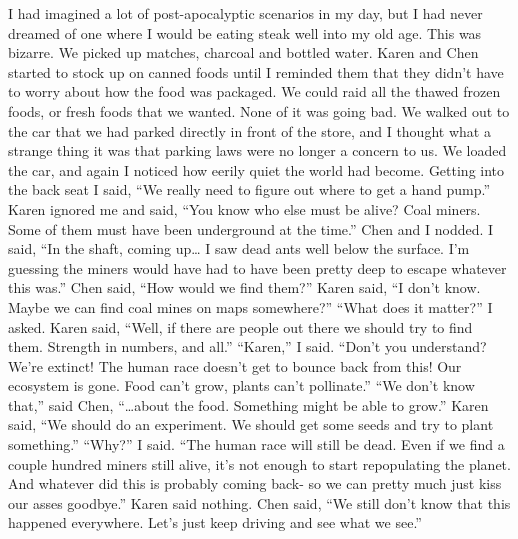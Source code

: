 \documentclass[a4paper]{article}
\begin{document}
I had imagined a lot of post-apocalyptic scenarios in my day, but I had never dreamed of one where I would be eating steak well into my old age. This was bizarre.
We picked up matches, charcoal and bottled water. Karen and Chen started to stock up on canned foods until I reminded them that they didn’t have to worry about how the food was packaged. We could raid all the thawed frozen foods, or fresh foods that we wanted. None of it was going bad.
We walked out to the car that we had parked directly in front of the store, and I thought what a strange thing it was that parking laws were no longer a concern to us. We loaded the car, and again I noticed how eerily quiet the world had become. Getting into the back seat I said, “We really need to figure out where to get a hand pump.”
Karen ignored me and said, “You know who else must be alive? Coal miners. Some of them must have been underground at the time.”
Chen and I nodded. I said, “In the shaft, coming up… I saw dead ants well below the surface. I’m guessing the miners would have had to have been pretty deep to escape whatever this was.”
Chen said, “How would we find them?”
Karen said, “I don’t know. Maybe we can find coal mines on maps somewhere?”
“What does it matter?” I asked.
Karen said, “Well, if there are people out there we should try to find them. Strength in numbers, and all.”
“Karen,” I said. “Don’t you understand? We’re extinct! The human race doesn’t get to bounce back from this! Our ecosystem is gone. Food can’t grow, plants can’t pollinate.”
“We don’t know that,” said Chen, “…about the food. Something might be able to grow.”
Karen said, “We should do an experiment. We should get some seeds and try to plant something.”
“Why?” I said. “The human race will still be dead. Even if we find a couple hundred miners still alive, it’s not enough to start repopulating the planet. And whatever did this is probably coming back- so we can pretty much just kiss our asses goodbye.”
Karen said nothing.
Chen said, “We still don’t know that this happened everywhere. Let’s just keep driving and see what we see.”
\end{document}
